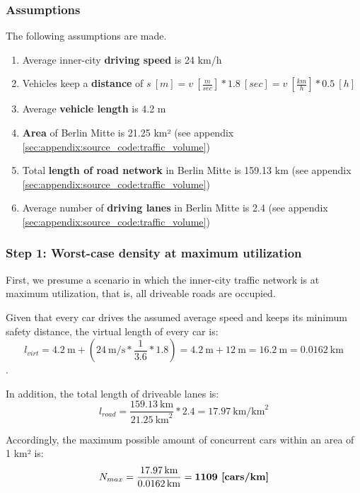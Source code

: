 \subsubsection{Assumptions}
The following assumptions are made.

\begin{samepage}
\begin{enumerate}
	\item Average inner-city \textbf{driving speed} is 24 km/h \cite{Forbes2008}
	\item Vehicles keep a \textbf{distance} of $s \ [m] = v \ [\frac{m}{sec}] * 1.8 \ [sec] = v \  [\frac{km}{h}] * 0.5 \ [h]$ \cite{wiki:sicherheitsabstand}
	\item Average \textbf{vehicle length} is 4.2 m
	\item \textbf{Area} of Berlin Mitte is 21.25 km² (see appendix \autoref{sec:appendix:source_code:traffic_volume})
	\item Total \textbf{length of road network} in Berlin Mitte is 159.13 km (see appendix \autoref{sec:appendix:source_code:traffic_volume})
	\item Average number of \textbf{driving lanes} in Berlin Mitte is 2.4 (see appendix \autoref{sec:appendix:source_code:traffic_volume})
\end{enumerate}
\end{samepage}

\subsubsection{Step 1: Worst-case density at maximum utilization}
First, we presume a scenario in which the inner-city traffic network is at maximum utilization, that is, all driveable roads are occupied.

Given that every car drives the assumed average speed and keeps its minimum safety distance, the virtual length of every car is: $$l_{virt} = \SI{4.2}{\meter} + (\SI{24}{\meter\per\second} * \frac{1}{3.6} * 1.8) = \SI{4.2}{\meter} + \SI{12}{\meter} = \SI{16.2}{\meter} = \SI{0.0162}{\km}$$.

In addition, the total length of driveable lanes is:
$$l_{road} = \frac{\SI{159.13}{\km}}{\SI{21.25}{\square\km}} * 2.4 = \SI{17.97}{\km\per\square\km}$$

Accordingly, the maximum possible amount of concurrent cars within an area of 1 km² is:
$$N_{max} = \frac{\SI{17.97}{\km}}{\SI{0.0162}{\km}} = \textbf{1109 [\si[detect-weight]{cars\per\km}]}$$

